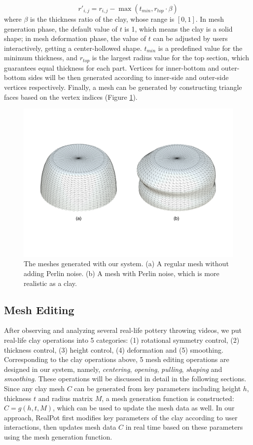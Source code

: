 \documentclass{svjour3}                     %
\begin{document}
\begin{equation}
r'_{i,j} = r_{i,j} - \max(t_{min}, r_{top} \cdot \beta)
\end{equation}
where $\beta$ is the thickness ratio of the clay, whose range is $[0,1]$. In mesh generation phase, the default value of $t$ is 1, which means the clay is a solid shape; in mesh deformation phase, the value of $t$ can be adjusted by users interactively, getting a center-hollowed shape. $t_{min}$ is a predefined value for the minimum thickness, and $r_{top}$ is the largest radius value for the top section, which guarantees equal thickness for each part.
Vertices for inner-bottom and outer-bottom sides will be then generated according to inner-side and outer-side vertices respectively. Finally, a mesh can be generated by constructing triangle faces based on the vertex indices (Figure \ref{fig:mesh}).

\begin{figure}
\includegraphics[width=\textwidth]{fig6}
\caption{The meshes generated with our system. (a) A regular mesh without adding Perlin noise. (b) A mesh with Perlin noise, which is more realistic as a clay.}
\label{fig:mesh}
\end{figure}

\subsection{Mesh Editing}
\label{sec:editing}
After observing and analyzing several real-life pottery throwing videos, we put real-life clay operations into 5 categories: (1) rotational symmetry control, (2) thickness control, (3) height control, (4) deformation and (5) smoothing.
{\color{blue} Corresponding to the clay operations above, 5 mesh editing operations are designed in our system, namely, \textit{centering}, \textit{opening}, \textit{pulling}, \textit{shaping} and \textit{smoothing}.}
These operations will be discussed in detail in the following sections.
Since any clay mesh $C$ can be generated from key parameters including height $h$, thickness $t$ and radius matrix $M$, a mesh generation function is constructed: $C =  g(h, t, M)$, which can be used to update the mesh data as well.
In our approach, RealPot first modifies key parameters of the clay according to user interactions, then updates mesh data $C$ in real time based on these parameters using the mesh generation function.
\end{document}
